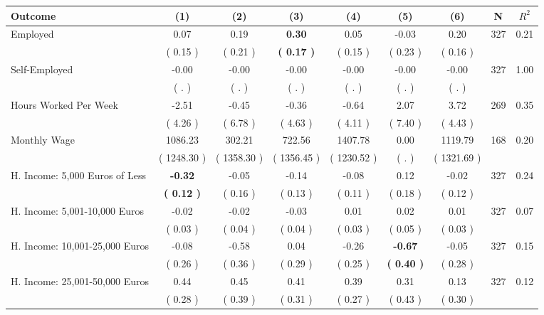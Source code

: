 \begin{tabular}{lcccccccc}
\toprule
 \textbf{Outcome} & \textbf{(1)} & \textbf{(2)} & \textbf{(3)} & \textbf{(4)} & \textbf{(5)} & \textbf{(6)} & \textbf{N} & \textbf{$ R^2$} \\
\midrule
Employed &      0.07 &      0.19 & \textbf{     0.30} &      0.05 &     -0.03 &      0.20 & 327 &       0.21 \\ 
 & (     0.15 ) & (     0.21 ) & \textbf{(     0.17 )} & (     0.15 ) & (     0.23 ) & (     0.16 ) & \\
Self-Employed &     -0.00 &     -0.00 &     -0.00 &     -0.00 &     -0.00 &     -0.00 & 327 &       1.00 \\ 
 & (        . ) & (        . ) & (        . ) & (        . ) & (        . ) & (        . ) & \\
Hours Worked Per Week &     -2.51 &     -0.45 &     -0.36 &     -0.64 &      2.07 &      3.72 & 269 &       0.35 \\ 
 & (     4.26 ) & (     6.78 ) & (     4.63 ) & (     4.11 ) & (     7.40 ) & (     4.43 ) & \\
Monthly Wage &   1086.23 &    302.21 &    722.56 &   1407.78 &      0.00 &   1119.79 & 168 &       0.20 \\ 
 & (  1248.30 ) & (  1358.30 ) & (  1356.45 ) & (  1230.52 ) & (        . ) & (  1321.69 ) & \\
H. Income: 5,000 Euros of Less & \textbf{    -0.32} &     -0.05 &     -0.14 &     -0.08 &      0.12 &     -0.02 & 327 &       0.24 \\ 
 & \textbf{(     0.12 )} & (     0.16 ) & (     0.13 ) & (     0.11 ) & (     0.18 ) & (     0.12 ) & \\
H. Income: 5,001-10,000 Euros &     -0.02 &     -0.02 &     -0.03 &      0.01 &      0.02 &      0.01 & 327 &       0.07 \\ 
 & (     0.03 ) & (     0.04 ) & (     0.04 ) & (     0.03 ) & (     0.05 ) & (     0.03 ) & \\
H. Income: 10,001-25,000 Euros &     -0.08 &     -0.58 &      0.04 &     -0.26 & \textbf{    -0.67} &     -0.05 & 327 &       0.15 \\ 
 & (     0.26 ) & (     0.36 ) & (     0.29 ) & (     0.25 ) & \textbf{(     0.40 )} & (     0.28 ) & \\
H. Income: 25,001-50,000 Euros &      0.44 &      0.45 &      0.41 &      0.39 &      0.31 &      0.13 & 327 &       0.12 \\ 
 & (     0.28 ) & (     0.39 ) & (     0.31 ) & (     0.27 ) & (     0.43 ) & (     0.30 ) & \\

\end{tabular}
